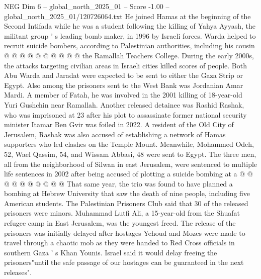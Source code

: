 \begin{textsample}{NEG Dim 6 – global\_north\_2025\_01 – Score -1.00 – global\_north\_2025\_01/120726064.txt}
He joined Hamas at the beginning of the Second Intifada while he was a student following the killing of Yahya Ayyash, the militant group ' s leading bomb maker, in 1996 by Israeli forces.
Warda helped to recruit suicide bombers, according to Palestinian authorities, including his cousin @ @ @ @ @ @ @ @ @ @ the Ramallah Teachers College.
During the early 2000s, the attacks targeting civilian areas in Israeli cities killed scores of people.
Both Abu Warda and Jaradat were expected to be sent to either the Gaza Strip or Egypt.
Also among the prisoners sent to the West Bank was Jordanian Amar Mardi.
A member of Fatah, he was involved in the 2001 killing of 18-year-old Yuri Gushchin near Ramallah.
Another released detainee was Rashid Rashak, who was imprisoned at 23 after his plot to assassinate former national security minister Itamar Ben Gvir was foiled in 2022.
A resident of the Old City of Jerusalem, Rashak was also accused of establishing a network of Hamas supporters who led clashes on the Temple Mount.
Meanwhile, Mohammed Odeh, 52, Wael Qassim, 54, and Wissam Abbasi, 48 were sent to Egypt.
The three men, all from the neighborhood of Silwan in east Jerusalem, were sentenced to multiple life sentences in 2002 after being accused of plotting a suicide bombing at a @ @ @ @ @ @ @ @ @ @ That same year, the trio was found to have planned a bombing at Hebrew University that saw the death of nine people, including five American students.
The Palestinian Prisoners Club said that 30 of the released prisoners were minors.
Muhammad Lutfi Ali, a 15-year-old from the Shuafat refugee camp in East Jerusalem, was the youngest freed.
The release of the prisoners was initially delayed after hostages Yehoud and Mozes were made to travel through a chaotic mob as they were handed to Red Cross officials in southern Gaza ' s Khan Younis.
Israel said it would delay freeing the prisoners"until the safe passage of our hostages can be guaranteed in the next releases".

\end{textsample}

